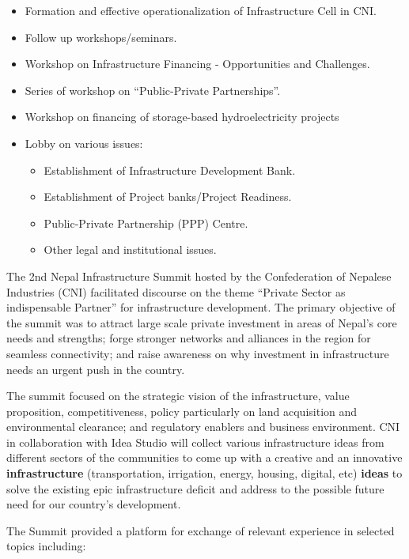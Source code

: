 \documentclass[
  openany]{book}
\providecommand{\tightlist}{%
  \setlength{\itemsep}{0pt}\setlength{\parskip}{0pt}}
\begin{document}
\begin{itemize}
\tightlist
\item
  Formation and effective operationalization of Infrastructure Cell in CNI.
\item
  Follow up workshops/seminars.
\item
  Workshop on Infrastructure Financing - Opportunities and Challenges.
\item
  Series of workshop on ``Public-Private Partnerships''.
\item
  Workshop on financing of storage-based hydroelectricity projects
\item
  Lobby on various issues:

  \begin{itemize}
  \tightlist
  \item
    Establishment of Infrastructure Development Bank.
  \item
    Establishment of Project banks/Project Readiness.
  \item
    Public-Private Partnership (PPP) Centre.
  \item
    Other legal and institutional issues.
  \end{itemize}
\end{itemize}

The 2nd Nepal Infrastructure Summit hosted by the Confederation of Nepalese Industries (CNI) facilitated discourse on the theme ``Private Sector as indispensable Partner'' for infrastructure development. The primary objective of the summit was to attract large scale private investment in areas of Nepal's core needs and strengths; forge stronger networks and alliances in the region for seamless connectivity; and raise awareness on why investment in infrastructure needs an urgent push in the country.

The summit focused on the strategic vision of the infrastructure, value proposition, competitiveness, policy particularly on land acquisition and environmental clearance; and regulatory enablers and business environment. CNI in collaboration with Idea Studio will collect various infrastructure ideas from different sectors of the communities to come up with a creative and an innovative \textbf{infrastructure} (transportation, irrigation, energy, housing, digital, etc) \textbf{ideas} to solve the existing epic infrastructure deficit and address to the possible future need for our country's development.

The Summit provided a platform for exchange of relevant experience in selected topics including:
\end{document}
